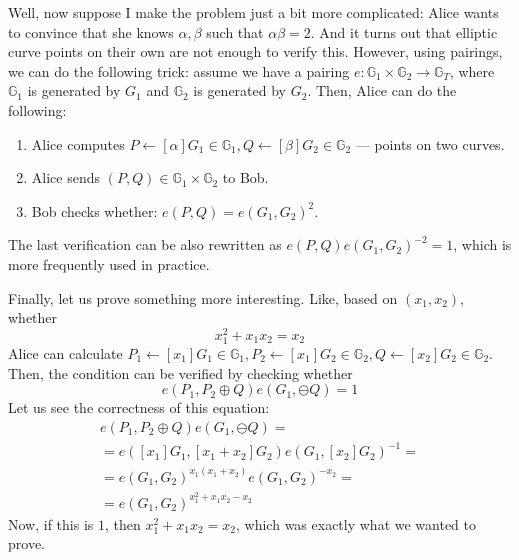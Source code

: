 \documentclass[../lecture-notes.tex]{subfiles}
\begin{document}
\begin{example}
    Well, now suppose I make the problem just a bit more complicated: Alice wants to convince that she knows $\alpha,\beta$ such that $\alpha\beta=2$. And it turns out that elliptic curve points on their own are not enough to verify this. However, using pairings, we can do the following trick: assume we have a pairing $e: \mathbb{G}_1 \times \mathbb{G}_2 \to \mathbb{G}_T$, where $\mathbb{G}_1$ is generated by $G_1$ and $\mathbb{G}_2$ is generated by $G_2$. Then, Alice can do the following:
    \begin{enumerate}
        \item Alice computes $P \gets [\alpha]G_1 \in \mathbb{G}_1, Q \gets [\beta]G_2 \in \mathbb{G}_2$ --- points on two curves.
        \item Alice sends $(P,Q) \in \mathbb{G}_1 \times \mathbb{G}_2$ to Bob.
        \item Bob checks whether: $e(P,Q) = e(G_1,G_2)^{2}$.
    \end{enumerate}
\end{example}
\begin{remark}
    The last verification can be also rewritten as $e(P,Q)e(G_1,G_2)^{-2}=1$, which is more frequently used in practice.
\end{remark}

\begin{example}
    Finally, let us prove something more interesting. Like, based on $(x_1,x_2)$, whether
    \begin{equation*}
        x_1^2 + x_1x_2 = x_2
    \end{equation*}
    Alice can calculate $P_1 \gets [x_1]G_1 \in \mathbb{G}_1, P_2 \gets [x_1]G_2 \in \mathbb{G}_2, Q \gets [x_2]G_2 \in \mathbb{G}_2$. Then, the condition can be verified by checking whether
    \begin{equation*}
        e(P_1,P_2\oplus Q)e(G_1,\ominus Q) = 1
    \end{equation*}
    Let us see the correctness of this equation:
    \begin{equation*}
        \begin{aligned}
            e(P_1,P_2\oplus Q)e(G_1,\ominus Q) = \\ 
            = e([x_1]G_1,[x_1+x_2]G_2)e(G_1,[x_2]G_2)^{-1} \nonumber = \\
            = e(G_1,G_2)^{x_1(x_1+x_2)}e(G_1,G_2)^{-x_2} = \\
            = e(G_1,G_2)^{x_1^2+x_1x_2-x_2}            
        \end{aligned}
    \end{equation*}
    Now, if this is $1$, then $x_1^2+x_1x_2=x_2$, which was exactly what we wanted to prove.
\end{example}
\end{document}
